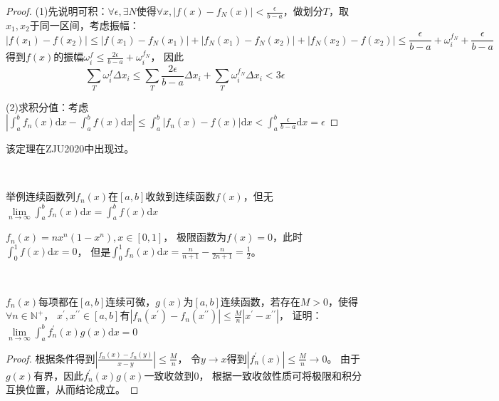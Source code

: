 \begin{proof}
  (1)先说明可积：$\forall \epsilon, \exists N$使得$\forall x, |f(x) - f_N(x)| < \frac{\epsilon}{b - a}$，做划分$T$，取$x_1,x_2$于同一区间，考虑振幅：
  \begin{equation*}
    |f(x_1) - f(x_2)| \leq |f(x_1) - f_N(x_1)| + |f_N(x_1) - f_N(x_2)| + |f_N(x_2) - f(x_2)| \leq \frac{\epsilon}{b - a} + \omega_i^{f_N} + \frac{\epsilon}{b-a}
  \end{equation*}
  得到$f(x)$的振幅$\omega_i^f \leq \frac{2\epsilon}{b - a} + \omega_i^{f_N}$，
  因此
  \begin{equation*}
    \sum \limits_T \omega_i^f \Delta x_i \leq \sum \limits_T \frac{2\epsilon}{b - a}\Delta x_i + \sum\limits_T \omega_i^{f_N} \Delta x_i < 3\epsilon
  \end{equation*}

  (2)求积分值：考虑$|\int_a^b f_n(x)\mathrm{d}x - \int_a^b f(x) \mathrm{d} x| \leq \int_a^b |f_n(x) - f(x)| \mathrm{d} x < \int_a^b \frac{\epsilon}{b - a}\mathrm{d} x = \epsilon$
\end{proof}

\begin{note}
  该定理在ZJU2020中出现过。
\end{note}

~

\begin{exercise}[不可积反例]
  举例连续函数列$f_n(x)$在$[a,b]$收敛到连续函数$f(x)$，但无$\lim \limits _{n \rightarrow \infty} \int_a^b f_n(x)\mathrm{d} x = \int_a^b f(x) \mathrm{d} x$
\end{exercise}

\begin{solution}
  $f_n(x) = nx^n (1 - x^n), x \in [0,1]$，
  极限函数为$f(x) = 0$，此时$\int_0^1 f(x) \mathrm{d} x = 0$，
  但是$\int_0^1 f_n(x) \mathrm{d} x = \frac{n}{n+1} - \frac{n}{2n+1} = \frac{1}{2}$。
\end{solution}

~

\begin{exercise}[可积性的应用]
  $f_n(x)$每项都在$[a,b]$连续可微，$g(x)$为$[a,b]$连续函数，若存在$M > 0$，使得$\forall n \in \mathbb{N}^+$，
  $x^{\prime},x^{\prime\prime} \in [a,b]$有$|f_n(x^{\prime}) - f_n(x^{\prime\prime})| \leq \frac{M}{n}|x^{\prime} - x^{\prime\prime}|$，
  证明：$\lim \limits _{n \rightarrow \infty} \int_a^b f_n^{\prime}(x)g(x) \mathrm{d} x = 0$
\end{exercise}

\begin{proof}
  根据条件得到$|\frac{f_n(x) - f_n(y)}{x - y}| \leq \frac{M}{n}$，
  令$y \rightarrow x$得到$|f_n^{\prime}(x)| \leq \frac{M}{n} \rightarrow 0$。
  由于$g(x)$有界，因此$f_n^{\prime}(x)g(x)$一致收敛到$0$，
  根据一致收敛性质可将极限和积分互换位置，从而结论成立。
\end{proof}

